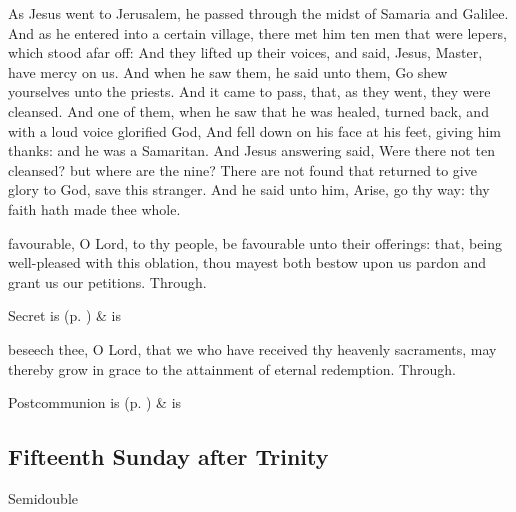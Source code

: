 
 As Jesus went to Jerusalem, he passed through the midst of Samaria and Galilee. And as he entered into a certain village, there met him ten men that were lepers, which stood afar off: And they lifted up their voices, and said, Jesus, Master, have mercy on us. And when he saw them, he said unto them, Go shew yourselves unto the priests. And it came to pass, that, as they went, they were cleansed. And one of them, when he saw that he was healed, turned back, and with a loud voice glorified God, And fell down on his face at his feet, giving him thanks: and he was a Samaritan. And Jesus answering said, Were there not ten cleansed? but where are the nine? There are not found that returned to give glory to God, save this stranger. And he said unto him, Arise, go thy way: thy faith hath made thee whole.


\secret
{} favourable, O Lord, to thy people, be favourable unto their offerings: that, being well-pleased with this oblation, thou mayest both bestow upon us pardon and grant us our petitions. Through.
\begin{rubric}
     Secret is  (p. \pageref{SPSaints}) \&  is 
\end{rubric}


\postcommunion
{} beseech thee, O Lord, that we who have received thy heavenly sacraments, may thereby grow in grace to the attainment of eternal redemption. Through.
\begin{rubric}
     Postcommunion is  (p. \pageref{SPSaints}) \&  is 
\end{rubric}


\clearpage
\subsection{Fifteenth Sunday after Trinity}
\begin{inhead}
{Semidouble}
\end{inhead}

